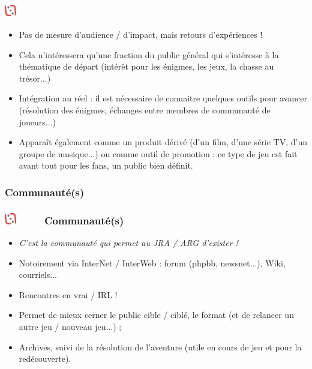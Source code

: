 \documentclass[slidetop,11pt]{beamer}
\def\moreInFrameTitleLeftt{\includegraphics[height=0.5cm]{img/ligueludique-0.png}~~~~~}
\begin{document}
\subsubsection{\sectionPartIIbIV} %
\begin{frame}
	\frametitle{\moreInFrameTitleLeftt \sectionPartIIbIV }
	\begin{itemize}
		\item Pas de mesure d'audience / d'impact, mais retours d'exp{\'e}riences !
		\item Cela n'int{\'e}ressera qu'une fraction du public g{\'e}n{\'e}ral qui s'int{\'e}resse {\`a} la th{\'e}matique de d{\'e}part (int{\'e}r{\^e}t pour les {\'e}nigmes, les jeux, la chasse au tr{\'e}sor...)
		\item Int{\'e}gration au r{\'e}el : il est n{\'e}cessaire de connaitre quelques outils pour avancer (r{\'e}solution des {\'e}nigmes, {\'e}changes entre membres de communaut{\'e} de joueurs...)
		\item Appara{\^i}t {\'e}galement comme un produit d{\'e}riv{\'e} (d'un film, d'une s{\'e}rie TV, d'un groupe de musique...) ou comme outil de promotion : ce type de jeu est fait avant tout pour les fans, un public bien d{\'e}finit. 
	\end{itemize}
\end{frame} 

\def\sectionPartIIbV{Communaut{\'e}(s)}
\subsubsection{\sectionPartIIbV} %
\begin{frame}
	\frametitle{\moreInFrameTitleLeftt \sectionPartIIbV }
	\begin{itemize}
		\item \emph{C'est la communaut{\'e} qui permet au JRA / ARG d'exister !}
		\item Notoirement via InterNet / InterWeb : forum (phpbb, newsnet...), Wiki, courriels...
		\item Rencontres en vrai / IRL !
		\item Permet de mieux cerner le public cible / cibl{\'e}, le format (et de relancer un autre jeu / nouveau jeu...) ; 
		\item Archives, suivi de la r{\'e}solution de l'aventure (utile en cours de jeu et pour la red{\'e}couverte). 
	\end{itemize}
\end{frame} 
\end{document}

